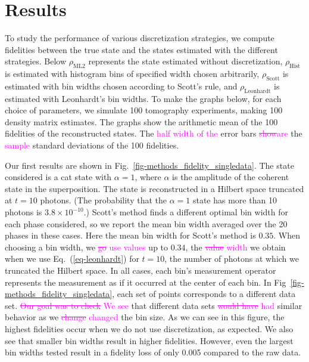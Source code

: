 \documentclass[
reprint,
superscriptaddress,
showpacs,
amsmath,
amssymb,
aps,
pra,
longbibliography
]{revtex4-1}
\providecommand{\aucmnt}[1]{#1}
\providecommand{\editcolor}[2]{\textcolor{#1}{#2}}
\providecommand{\aucmnt}[1]{}
\providecommand{\editcolor}[2]{#2}
\newcommand{\SG}[1]{\editcolor{magenta}{#1}}
\newcommand{\SGs}[1]{\aucmnt{\editcolor{magenta}{\sout{#1}}}}
\begin{document}
\section{Results}
\label{results}
To study the performance of various discretization strategies, we
compute fidelities between the true state and the states estimated
with the different strategies. Below $\rho_{\mathrm{ML2}}$ represents
the state estimated without discretization, $\rho_{\mathrm{Hist}}$ is
estimated with histogram bins of specified width chosen arbitrarily,
$\rho_{\mathrm{Scott}}$ is estimated with bin widths chosen according
to Scott's rule, and $\rho_{\mathrm{Leonhardt}}$ is estimated with
Leonhardt's bin widths. To make the graphs below, for each choice of
parameters, we simulate 100 tomography experiments, making 100 density
matrix estimates.  The graphs show the arithmetic mean of the 100
fidelities of the reconstructed states. The \SG{half width of the}
error bars \SGs{show}\SG{are} the \SG{sample} standard deviations of
the 100 fidelities.

Our first results are shown in
Fig.~\ref{fig-methods_fidelity_singledata}. The state considered is a
cat state with $\alpha = 1$, where $\alpha$ is the amplitude of the
coherent state in the superposition.  The state is reconstructed in a
Hilbert space truncated at $t=10$ photons. (The probability that the
$\alpha=1$ state has more than 10 photons is $3.8 \times 10^{-10}$.)
Scott's method finds a different optimal bin width for each phase
considered, so we report the mean bin width averaged over the 20
phases in these cases.  Here the mean bin width for Scott's method is
$0.35$.  When choosing a bin width, we \SGs{go} \SG{use values} up to
$0.34$, the \SGs{value} \SG{width} we obtain when we use
Eq.~(\ref{eq-leonhardt}) for $t=10$, the number of photons at which we
truncated the Hilbert space.  In all cases, each bin's measurement
operator represents the measurement as if it occurred at the center of
each bin. In Fig~\ref{fig-methods_fidelity_singledata}, each set of
points corresponds to a different data set. \SGs{Our goal was to
  check} \SG{We see} that different data sets \SGs{would have}
\SG{had} similar behavior as we \SGs{change} \SG{changed} the bin
size. As we can see in this figure, the highest fidelities occur when
we do not use discretization, as expected.  We also see that smaller
bin widths result in higher fidelities.  However, even the largest bin
widths tested result in a fidelity loss of only 0.005 compared to the
raw data.
\end{document}
